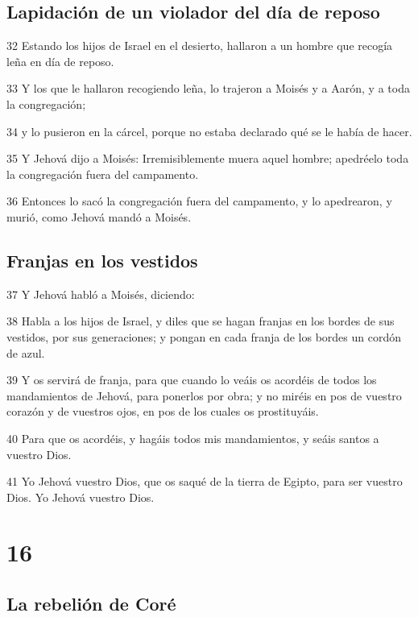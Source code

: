 \section*{Lapidación de un violador del día de reposo}

\par 32 Estando los hijos de Israel en el desierto, hallaron a un hombre que recogía leña en día de reposo.
\par 33 Y los que le hallaron recogiendo leña, lo trajeron a Moisés y a Aarón, y a toda la congregación;
\par 34 y lo pusieron en la cárcel, porque no estaba declarado qué se le había de hacer.
\par 35 Y Jehová dijo a Moisés: Irremisiblemente muera aquel hombre; apedréelo toda la congregación fuera del campamento.
\par 36 Entonces lo sacó la congregación fuera del campamento, y lo apedrearon, y murió, como Jehová mandó a Moisés.

\section*{Franjas en los vestidos}

\par 37 Y Jehová habló a Moisés, diciendo:
\par 38 Habla a los hijos de Israel, y diles que se hagan franjas en los bordes de sus vestidos, por sus generaciones; y pongan en cada franja de los bordes un cordón de azul.
\par 39 Y os servirá de franja, para que cuando lo veáis os acordéis de todos los mandamientos de Jehová, para ponerlos por obra; y no miréis en pos de vuestro corazón y de vuestros ojos, en pos de los cuales os prostituyáis.
\par 40 Para que os acordéis, y hagáis todos mis mandamientos, y seáis santos a vuestro Dios.
\par 41 Yo Jehová vuestro Dios, que os saqué de la tierra de Egipto, para ser vuestro Dios. Yo Jehová vuestro Dios.

\chapter{16}

\section*{La rebelión de Coré}

